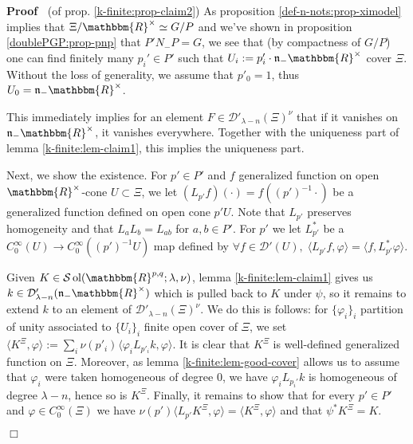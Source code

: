\documentclass{article}
\newcommand{\assign}{:=}
\newcommand{\tmop}[1]{\ensuremath{\operatorname{#1}}}
\newenvironment{proof}{\noindent\textbf{Proof\ }}{\hspace*{\fill}$\Box$\medskip}
\numberwithin{definition}{section}
\numberwithin{lemma}{section}
\numberwithin{proposition}{section}
{\theorembodyfont{\rmfamily}\newtheorem{remark}{Remark}
\numberwithin{remark}{section}
}
\begin{document}
\begin{proof}
  (of prop. \ref{k-finite:prop-claim2}) As proposition
  \ref{def-n-nots:prop-ximodel} implies that $\Xi /\mathbbm{R}^{\times} \simeq
  G / P$ and we've shown in proposition \ref{doublePGP:prop-pnp} that $P' N_-
  P = G$, we see that (by compactness of $G / P$) one can find finitely many
  $p_i' \in P'$ such that $U_i \assign p_i' \cdot \mathfrak{n}_-
  \mathbbm{R}^{\times}$ cover $\Xi$. Without the loss of generality, we assume
  that $p'_0 = 1$, thus $U_0 =\mathfrak{n}_- \mathbbm{R}^{\times}$.
  
  This immediately implies for an element $F \in \mathcal{D}'_{\lambda - n} (
  \Xi)^{\nu}$ that if it vanishes on $\mathfrak{n}_- \mathbbm{R}^{\times}$, it
  vanishes everywhere. Together with the uniqueness part of lemma
  \ref{k-finite:lem-claim1}, this implies the uniqueness part.
  
  Next, we show the existence. For $p' \in P'$ and $f$ generalized function on
  open $\mathbbm{R}^{\times}$-cone $U \subset \Xi$, we let $( L_{p'} f) (
  \cdot) = f ( ( p')^{- 1} \cdot)$ be a generalized function defined on open
  cone $p' U$. Note that $L_{p'}$ preserves homogeneity and that $L_a L_b =
  L_{a b}$ for $a, b \in P'$. For $p'$ we let $L_{p'}^{\ast}$ be a
  $C_0^{\infty} ( U) \rightarrow C_0^{\infty} ( ( p')^{- 1} U)$ map defined by
  $\forall f \in \mathcal{D}' ( U), \; \langle L_{p'} f, \varphi \rangle =
  \langle f, L_{p'}^{\ast} \varphi \rangle$.
  
  Given $K \in \mathcal{S} \tmop{ol} ( \mathbbm{R}^{p, q} ; \lambda, \nu)$,
  lemma \ref{k-finite:lem-claim1} gives us $k \in \mathcal{D}'_{\lambda - n} (
  \mathfrak{n}_- \mathbbm{R}^{\times})$ which is pulled back to $K$ under
  $\psi$, so it remains to extend $k$ to an element of $\mathcal{D}'_{\lambda
  - n} ( \Xi)^{\nu}$. We do this is follows: for $\{ \varphi_i \}_i$ partition
  of unity associated to $\{ U_i \}_i$ finite open cover of $\Xi$, we set
  $\langle K^{\Xi}, \varphi \rangle \assign \sum_i \nu ( p'_i)^{} \langle
  \varphi_i L_{p'_i} k, \varphi \rangle$. It is clear that $K^{\Xi}$ is
  well-defined generalized function on $\Xi$. Moreover, as lemma
  \ref{k-finite:lem-good-cover} allows us to assume that $\varphi_i$ were
  taken homogeneous of degree 0, we have $\varphi_i L_{p_i'} k$ is homogeneous
  of degree $\lambda - n$, hence so is $K^{\Xi}$. Finally, it remains to show
  that for every $p' \in P'$ and $\varphi \in C^{\infty}_0 ( \Xi)$ we have
  $\nu ( p') \langle L_{p'} K^{\Xi}, \varphi \rangle = \langle K^{\Xi},
  \varphi \rangle$ and that $\psi^{\ast} K^{\Xi} = K$.
  

\end{proof}
\end{document}
